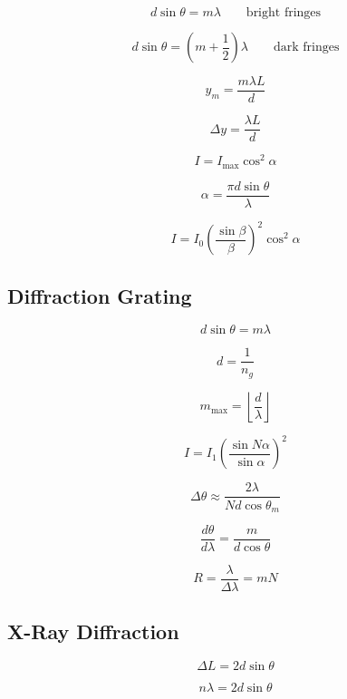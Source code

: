 \documentclass{studentnotes}
\begin{document}
\[
    \boxed{
        d\sin\theta=m\lambda
    }
    \qquad
    \text{bright fringes}
\]

\[
    \boxed{
        d\sin\theta
        =
        \left(m+\frac12\right)\lambda
    }
    \qquad
    \text{dark fringes}
\]

\[
    \boxed{
        y_m
        =
        \frac{m\lambda L}{d}
    }
\]

\[
    \boxed{
        \Delta y
        =
        \frac{\lambda L}{d}
    }
\]

\[
    \boxed{
        I
        =
        I_{\max}\cos^2\alpha
    }
\]

\[
    \boxed{
        \alpha
        =
        \frac{\pi d\sin\theta}{\lambda}
    }
\]

\[
    \boxed{
        I
        =
        I_0
            {\left(
                \frac{\sin\beta}{\beta}
                \right)}^2
        \cos^2\alpha
    }
\]

\subsection{Diffraction Grating}

\[
    \boxed{
        d\sin\theta=m\lambda
    }
\]

\[
    \boxed{
        d=\frac{1}{n_g}
    }
\]

\[
    \boxed{
        m_{\max}
        =
        \left\lfloor
        \frac{d}{\lambda}
        \right\rfloor
    }
\]

\[
    \boxed{
        I
        =
        I_1
            {\left(
                \frac{\sin N\alpha}{\sin\alpha}
                \right)}^2
    }
\]

\[
    \boxed{
        \Delta\theta
        \approx
        \frac{2\lambda}
        {Nd\cos\theta_m}
    }
\]

\[
    \boxed{
        \frac{d\theta}{d\lambda}
        =
        \frac{m}{d\cos\theta}
    }
\]

\[
    \boxed{
        R
        =
        \frac{\lambda}{\Delta\lambda}
        =
        mN
    }
\]

\subsection{X-Ray Diffraction}

\[
    \boxed{
        \Delta L
        =
        2d\sin\theta
    }
\]

\[
    \boxed{
        n\lambda
        =
        2d\sin\theta
    }
\]
\end{document}
